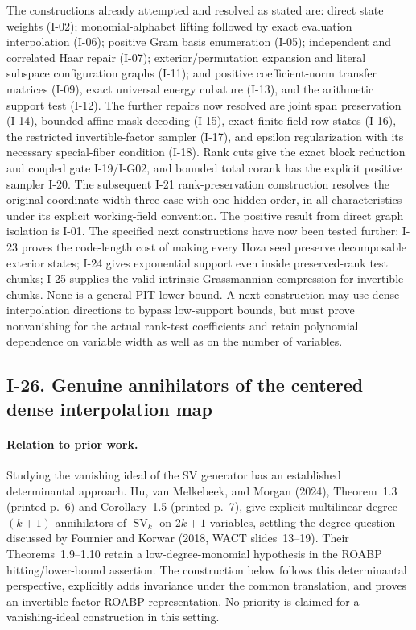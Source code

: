 \documentclass[11pt,a4paper]{article}
\theoremstyle{definition}\newtheorem{definition}{Definition}
\begin{document}
The constructions already attempted and resolved as stated are:
direct state weights (I-02); monomial-alphabet lifting followed
by exact evaluation interpolation (I-06); positive Gram basis
enumeration (I-05); independent and correlated Haar repair
(I-07); exterior/permutation expansion and literal subspace
configuration graphs (I-11); and positive coefficient-norm
transfer matrices (I-09), exact universal energy cubature (I-13),
and the arithmetic support test (I-12).  The further repairs now
resolved are joint span preservation (I-14), bounded affine mask
decoding (I-15), exact finite-field row states (I-16), the restricted
invertible-factor sampler (I-17), and epsilon regularization with
its necessary special-fiber condition (I-18).  Rank cuts give the exact
block reduction and coupled gate I-19/I-G02, and bounded total corank
has the explicit positive sampler I-20.  The subsequent I-21
rank-preservation construction resolves the original-coordinate
width-three case with one hidden order, in all characteristics
under its explicit working-field convention.  The positive result from
direct graph isolation is I-01.  The specified next constructions have now been tested further:
I-23 proves the code-length cost of making every Hoza seed preserve
decomposable exterior states; I-24 gives exponential support even
inside preserved-rank test chunks; I-25 supplies the valid intrinsic
Grassmannian compression for invertible chunks.  None is a general
PIT lower bound.  A next construction may use dense interpolation
directions to bypass low-support bounds, but must prove nonvanishing
for the actual rank-test coefficients and retain polynomial dependence
on variable width as well as on the number of variables.


\subsection{I-26. Genuine annihilators of the centered dense interpolation map}
\label{I-26}

\paragraph{Relation to prior work.}
Studying the vanishing ideal of the SV generator has an established
determinantal approach.  Hu, van Melkebeek, and Morgan (2024),
Theorem~1.3 (printed p.~6) and Corollary~1.5 (printed p.~7), give explicit
multilinear degree-$(k+1)$ annihilators of $\operatorname{SV}_k$
on $2k+1$ variables, settling the degree question discussed by
Fournier and Korwar (2018, WACT slides~13--19).
Their Theorems~1.9--1.10 retain a low-degree-monomial hypothesis
in the ROABP hitting/lower-bound assertion.  The construction
below follows this determinantal perspective, explicitly adds
invariance under the common translation, and proves an
invertible-factor ROABP representation.  No priority is claimed
for a vanishing-ideal construction in this setting.
\end{document}
